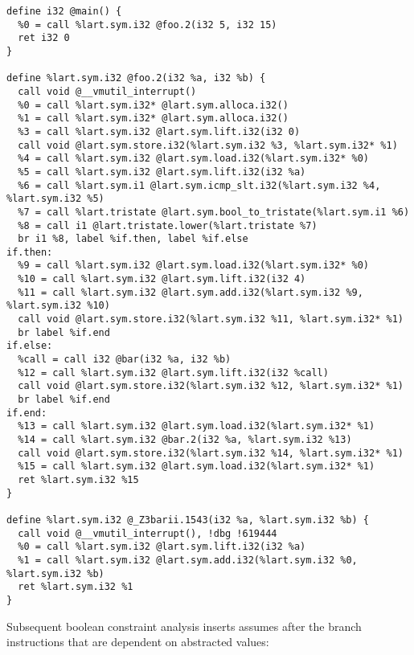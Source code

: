 \begin{verbatim}
define i32 @main() {
  %0 = call %lart.sym.i32 @foo.2(i32 5, i32 15)
  ret i32 0
}

define %lart.sym.i32 @foo.2(i32 %a, i32 %b) {
  call void @__vmutil_interrupt()
  %0 = call %lart.sym.i32* @lart.sym.alloca.i32()
  %1 = call %lart.sym.i32* @lart.sym.alloca.i32()
  %3 = call %lart.sym.i32 @lart.sym.lift.i32(i32 0)
  call void @lart.sym.store.i32(%lart.sym.i32 %3, %lart.sym.i32* %1)
  %4 = call %lart.sym.i32 @lart.sym.load.i32(%lart.sym.i32* %0)
  %5 = call %lart.sym.i32 @lart.sym.lift.i32(i32 %a)
  %6 = call %lart.sym.i1 @lart.sym.icmp_slt.i32(%lart.sym.i32 %4, %lart.sym.i32 %5)
  %7 = call %lart.tristate @lart.sym.bool_to_tristate(%lart.sym.i1 %6)
  %8 = call i1 @lart.tristate.lower(%lart.tristate %7)
  br i1 %8, label %if.then, label %if.else
if.then:
  %9 = call %lart.sym.i32 @lart.sym.load.i32(%lart.sym.i32* %0)
  %10 = call %lart.sym.i32 @lart.sym.lift.i32(i32 4)
  %11 = call %lart.sym.i32 @lart.sym.add.i32(%lart.sym.i32 %9, %lart.sym.i32 %10)
  call void @lart.sym.store.i32(%lart.sym.i32 %11, %lart.sym.i32* %1)
  br label %if.end
if.else:
  %call = call i32 @bar(i32 %a, i32 %b)
  %12 = call %lart.sym.i32 @lart.sym.lift.i32(i32 %call)
  call void @lart.sym.store.i32(%lart.sym.i32 %12, %lart.sym.i32* %1)
  br label %if.end
if.end:
  %13 = call %lart.sym.i32 @lart.sym.load.i32(%lart.sym.i32* %1)
  %14 = call %lart.sym.i32 @bar.2(i32 %a, %lart.sym.i32 %13)
  call void @lart.sym.store.i32(%lart.sym.i32 %14, %lart.sym.i32* %1)
  %15 = call %lart.sym.i32 @lart.sym.load.i32(%lart.sym.i32* %1)
  ret %lart.sym.i32 %15
}

define %lart.sym.i32 @_Z3barii.1543(i32 %a, %lart.sym.i32 %b) {
  call void @__vmutil_interrupt(), !dbg !619444
  %0 = call %lart.sym.i32 @lart.sym.lift.i32(i32 %a)
  %1 = call %lart.sym.i32 @lart.sym.add.i32(%lart.sym.i32 %0, %lart.sym.i32 %b)
  ret %lart.sym.i32 %1
}
\end{verbatim}

\noindent
Subsequent boolean constraint analysis inserts assumes after the branch
instructions that are dependent on abstracted values:

